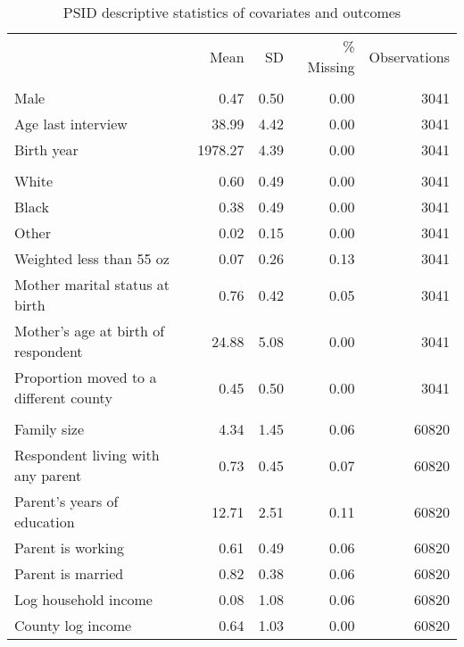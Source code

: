 \begin{table}[htp]
\setlength{\tabcolsep}{3pt}
\renewcommand{\arraystretch}{0.75}
\centering
\begin{threeparttable}
\centering
\caption{PSID descriptive statistics of covariates and outcomes} 
\label{tab:psid_descriptives}
\begingroup\fontsize{9pt}{10pt}\selectfont
\begin{tabular}{lrrrr}
  \hline
\addlinespace
  & Mean & SD & \% Missing & Observations \\
\addlinespace
 \hline
  \addlinespace
\multicolumn{5}{l}{\textbf{\textit{Time-invariant covariates}}} \\
\addlinespace
Male & 0.47 & 0.50 & 0.00 & 3041 \\ 
  Age last interview & 38.99 & 4.42 & 0.00 & 3041 \\ 
  Birth year & 1978.27 & 4.39 & 0.00 & 3041 \\ 
   \addlinespace
\multicolumn{5}{l}{\textit{Race-Ethnicity}} \\
\quad White & 0.60 & 0.49 & 0.00 & 3041 \\ 
  \quad Black & 0.38 & 0.49 & 0.00 & 3041 \\ 
  \quad Other & 0.02 & 0.15 & 0.00 & 3041 \\ 
   \addlinespace
Weighted less than 55 oz & 0.07 & 0.26 & 0.13 & 3041 \\ 
  Mother marital status at birth & 0.76 & 0.42 & 0.05 & 3041 \\ 
  Mother's age at birth of respondent & 24.88 & 5.08 & 0.00 & 3041 \\ 
  Proportion moved to a different county & 0.45 & 0.50 & 0.00 & 3041 \\ 
   \addlinespace
\multicolumn{5}{l}{\textbf{\textit{Time-variant covariates}}} \\
\addlinespace
Family size & 4.34 & 1.45 & 0.06 & 60820 \\ 
  Respondent living with any parent & 0.73 & 0.45 & 0.07 & 60820 \\ 
  Parent's years of education & 12.71 & 2.51 & 0.11 & 60820 \\ 
  Parent is working & 0.61 & 0.49 & 0.06 & 60820 \\ 
  Parent is married & 0.82 & 0.38 & 0.06 & 60820 \\ 
  Log household income & 0.08 & 1.08 & 0.06 & 60820 \\ 
  County log income & 0.64 & 1.03 & 0.00 & 60820 \\ 

\end{tabular}
\end{threeparttable}
\end{table}
